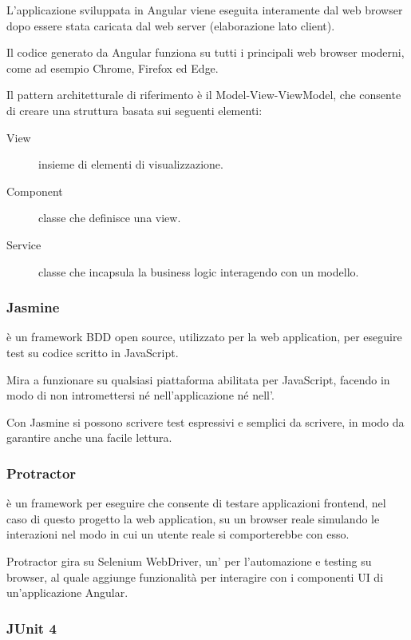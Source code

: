 \documentclass[../manuale-sviluppatore.tex]{subfiles}
\begin{document}
L'applicazione sviluppata in Angular viene eseguita interamente dal web browser dopo essere stata caricata dal web server (elaborazione lato client).

Il codice generato da Angular funziona su tutti i principali web browser moderni, come ad esempio Chrome, Firefox ed Edge.

Il pattern architetturale di riferimento è il Model-View-ViewModel, che consente di creare una struttura basata sui seguenti elementi:
\begin{description}
    \item[View] insieme di elementi di visualizzazione.
    \item[Component] classe che definisce una view.
    \item[Service] classe che incapsula la business logic interagendo con un modello.
\end{description}

\subsubsection{Jasmine}%
\label{subs:jasmine}

 è un framework BDD open source, utilizzato per la web application, per eseguire test su codice scritto in JavaScript.

Mira a funzionare su qualsiasi piattaforma abilitata per JavaScript, facendo in modo di non intromettersi né nell'applicazione né nell'.

Con Jasmine si possono scrivere test espressivi e semplici da scrivere, in modo da garantire anche una facile lettura.

\subsubsection{Protractor}%
\label{subs:protractor}

 è un framework per eseguire  che consente di testare applicazioni frontend, nel caso di questo progetto la web application, su un browser reale simulando le interazioni nel modo in cui un utente reale si comporterebbe con esso.

Protractor gira su Selenium WebDriver, un' per l’automazione e testing su browser, al quale aggiunge funzionalità per interagire con i componenti UI di un’applicazione Angular.

\subsubsection{JUnit 4}%
\label{subs:junit4}
\end{document}
